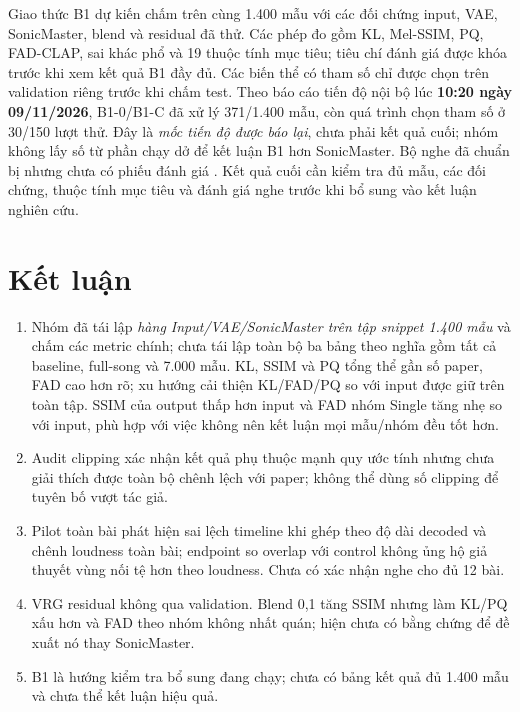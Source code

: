 \documentclass[10pt,a4paper]{article}
\begin{document}
Giao thức B1 dự kiến chấm trên cùng 1.400 mẫu với các đối chứng input, VAE, SonicMaster, blend và residual đã thử. Các phép đo gồm KL, Mel-SSIM, PQ, FAD-CLAP, sai khác phổ và 19 thuộc tính mục tiêu; tiêu chí đánh giá được khóa trước khi xem kết quả B1 đầy đủ. Các biến thể có tham số chỉ được chọn trên validation riêng trước khi chấm test. Theo báo cáo tiến độ nội bộ lúc \textbf{10:20 ngày 09/11/2026}, B1-0/B1-C đã xử lý 371/1.400 mẫu, còn quá trình chọn tham số ở 30/150 lượt thử. Đây là \emph{mốc tiến độ được báo lại}, chưa phải kết quả cuối; nhóm không lấy số từ phần chạy dở để kết luận B1 hơn SonicMaster. Bộ nghe đã chuẩn bị nhưng chưa có phiếu đánh giá \cite{b1status}. Kết quả cuối cần kiểm tra đủ mẫu, các đối chứng, thuộc tính mục tiêu và đánh giá nghe trước khi bổ sung vào kết luận nghiên cứu.

\section{Kết luận}
\begin{enumerate}
\item Nhóm đã tái lập \emph{hàng Input/VAE/SonicMaster trên tập snippet 1.400 mẫu} và chấm các metric chính; chưa tái lập toàn bộ ba bảng theo nghĩa gồm tất cả baseline, full-song và 7.000 mẫu. KL, SSIM và PQ tổng thể gần số paper, FAD cao hơn rõ; xu hướng cải thiện KL/FAD/PQ so với input được giữ trên toàn tập. SSIM của output thấp hơn input và FAD nhóm Single tăng nhẹ so với input, phù hợp với việc không nên kết luận mọi mẫu/nhóm đều tốt hơn.
\item Audit clipping xác nhận kết quả phụ thuộc mạnh quy ước tính nhưng chưa giải thích được toàn bộ chênh lệch với paper; không thể dùng số clipping để tuyên bố vượt tác giả.
\item Pilot toàn bài phát hiện sai lệch timeline khi ghép theo độ dài decoded và chênh loudness toàn bài; endpoint so overlap với control không ủng hộ giả thuyết vùng nối tệ hơn theo loudness. Chưa có xác nhận nghe cho đủ 12 bài.
\item VRG residual không qua validation. Blend 0,1 tăng SSIM nhưng làm KL/PQ xấu hơn và FAD theo nhóm không nhất quán; hiện chưa có bằng chứng để đề xuất nó thay SonicMaster.
\item B1 là hướng kiểm tra bổ sung đang chạy; chưa có bảng kết quả đủ 1.400 mẫu và chưa thể kết luận hiệu quả.
\end{enumerate}
\end{document}

